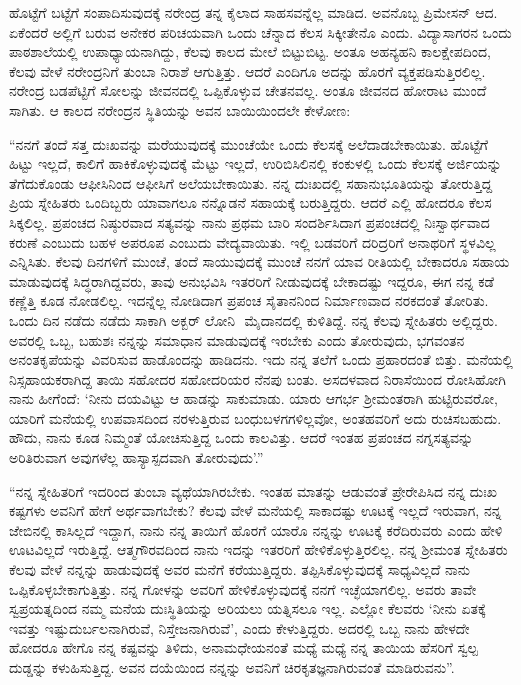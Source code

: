 ಹೊಟ್ಟೆಗೆ ಬಟ್ಟೆಗೆ ಸಂಪಾದಿಸುವುದಕ್ಕೆ ನರೇಂದ್ರ ತನ್ನ ಕೈಲಾದ ಸಾಹಸವನ್ನೆಲ್ಲ ಮಾಡಿದ. ಅವನೊಬ್ಬ ಪ್ರಿಮೇಸನ್ ಆದ. ಏಕೆಂದರೆ ಅಲ್ಲಿಗೆ ಬರುವ ಅನೇಕರ ಪರಿಚಯವಾಗಿ ಒಂದು ಚೆನ್ನಾದ ಕೆಲಸ ಸಿಕ್ಕೀತೇನೊ ಎಂದು. ವಿದ್ಯಾಸಾಗರನ ಒಂದು ಪಾಠಶಾಲೆಯಲ್ಲಿ ಉಪಾಧ್ಯಾಯನಾಗಿದ್ದು, ಕೆಲವು ಕಾಲದ ಮೇಲೆ ಬಿಟ್ಟುಬಿಟ್ಟ. ಅಂತೂ ಅಹನ್ಯಹನಿ ಕಾಲಕ್ಷೇಪದಿಂದ, ಕೆಲವು ವೇಳೆ ನರೇಂದ್ರನಿಗೆ ತುಂಬಾ ನಿರಾಶೆ ಆಗುತ್ತಿತ್ತು. ಆದರೆ ಎಂದಿಗೂ ಅದನ್ನು ಹೊರಗೆ ವ್ಯಕ್ತಪಡಿಸುತ್ತಿರಲಿಲ್ಲ. ನರೇಂದ್ರ ಬಡಪೆಟ್ಟಿಗೆ ಸೋಲನ್ನು ಜೀವನದಲ್ಲಿ ಒಪ್ಪಿಕೊಳ್ಳುವ ಚೇತನವಲ್ಲ. ಅಂತೂ ಜೀವನದ ಹೋರಾಟ ಮುಂದೆ ಸಾಗಿತು. ಆ ಕಾಲದ ನರೇಂದ್ರನ ಸ್ಥಿತಿಯನ್ನು ಅವನ ಬಾಯಿಯಿಂದಲೇ ಕೇಳೋಣ:

“ನನಗೆ ತಂದೆ ಸತ್ತ ದುಃಖವನ್ನು ಮರೆಯುವುದಕ್ಕೆ ಮುಂಚೆಯೇ ಒಂದು ಕೆಲಸಕ್ಕೆ ಅಲೆದಾಡಬೇಕಾಯಿತು. ಹೊಟ್ಟೆಗೆ ಹಿಟ್ಟು ಇಲ್ಲದೆ, ಕಾಲಿಗೆ ಹಾಕಿಕೊಳ್ಳುವುದಕ್ಕೆ ಮೆಟ್ಟು ಇಲ್ಲದೆ, ಉರಿಬಿಸಿಲಿನಲ್ಲಿ ಕಂಕುಳಲ್ಲಿ ಒಂದು ಕೆಲಸಕ್ಕೆ ಅರ್ಜಿಯನ್ನು ತೆಗೆದುಕೊಂಡು ಆಫೀಸಿನಿಂದ ಆಫೀಸಿಗೆ ಅಲೆಯಬೇಕಾಯಿತು. ನನ್ನ ದುಃಖದಲ್ಲಿ ಸಹಾನುಭೂತಿಯನ್ನು ತೋರುತ್ತಿದ್ದ ಪ್ರಿಯ ಸ್ನೇಹಿತರು ಒಂದಿಬ್ಬರು ಯಾವಾಗಲೂ ನನ್ನೊಡನೆ ಸಹಾಯಕ್ಕೆ ಬರುತ್ತಿದ್ದರು. ಆದರೆ ಎಲ್ಲಿ ಹೋದರೂ ಕೆಲಸ ಸಿಕ್ಕಲಿಲ್ಲ. ಪ್ರಪಂಚದ ನಿಷ್ಠುರವಾದ ಸತ್ಯವನ್ನು ನಾನು ಪ್ರಥಮ ಬಾರಿ ಸಂದರ್ಶಿಸಿದಾಗ ಪ್ರಪಂಚದಲ್ಲಿ ನಿಃಸ್ವಾರ್ಥವಾದ ಕರುಣೆ ಎಂಬುದು ಬಹಳ ಅಪರೂಪ ಎಂಬುದು ವೇದ್ಯವಾಯಿತು. ಇಲ್ಲಿ ಬಡವರಿಗೆ ದರಿದ್ರರಿಗೆ ಅನಾಥರಿಗೆ ಸ್ಥಳವಿಲ್ಲ ಎನ್ನಿಸಿತು. ಕೆಲವು ದಿನಗಳಿಗೆ ಮುಂಚೆ, ತಂದೆ ಸಾಯುವುದಕ್ಕೆ ಮುಂಚೆ ನನಗೆ ಯಾವ ರೀತಿಯಲ್ಲಿ ಬೇಕಾದರೂ ಸಹಾಯ ಮಾಡುವುದಕ್ಕೆ ಸಿದ್ಧರಾಗಿದ್ದವರು, ತಾವು ಅನುಭವಿಸಿ ಇತರರಿಗೆ ನೀಡುವುದಕ್ಕೆ ಬೇಕಾದಷ್ಟು ಇದ್ದರೂ, ಈಗ ನನ್ನ ಕಡೆ ಕಣ್ಣೆತ್ತಿ ಕೂಡ ನೋಡಲಿಲ್ಲ. ಇದನ್ನೆಲ್ಲ ನೋಡಿದಾಗ ಪ್ರಪಂಚ ಸೈತಾನನಿಂದ ನಿರ್ಮಾಣವಾದ ನರಕದಂತೆ ತೋರಿತು. ಒಂದು ದಿನ ನಡೆದು ನಡೆದು ಸಾಕಾಗಿ ಅಕ್ಬರ್ ಲೋನಿ ‍ ಮೈದಾನದಲ್ಲಿ ಕುಳಿತಿದ್ದೆ. ನನ್ನ ಕೆಲವು ಸ್ನೇಹಿತರು ಅಲ್ಲಿದ್ದರು. ಅವರಲ್ಲಿ ಒಬ್ಬ, ಬಹುಶಃ ನನ್ನನ್ನು ಸಮಾಧಾನ ಮಾಡುವುದಕ್ಕೆ ಇರಬೇಕು ಎಂದು ತೋರುವುದು, ಭಗವಂತನ ಅನಂತಕೃಪೆಯನ್ನು ವಿವರಿಸುವ ಹಾಡೊಂದನ್ನು ಹಾಡಿದನು. ಇದು ನನ್ನ ತಲೆಗೆ ಒಂದು ಪ್ರಹಾರದಂತೆ ಬಿತ್ತು. ಮನೆಯಲ್ಲಿ ನಿಸ್ಸಹಾಯಕರಾಗಿದ್ದ ತಾಯಿ ಸಹೋದರ ಸಹೋದರಿಯರ ನೆನಪು ಬಂತು. ಅಸದಳವಾದ ನಿರಾಸೆಯಿಂದ ರೋಸಿಹೋಗಿ ನಾನು ಹೀಗೆಂದೆ: ‘ನೀನು ದಯವಿಟ್ಟು ಆ ಹಾಡನ್ನು ಸಾಕುಮಾಡು. ಯಾರು ಆಗರ್ಭ ಶ‍್ರೀಮಂತರಾಗಿ ಹುಟ್ಟಿರುವರೋ, ಯಾರಿಗೆ ಮನೆಯಲ್ಲಿ ಉಪವಾಸದಿಂದ ನರಳುತ್ತಿರುವ ಬಂಧುಬಳಗಗಳಿಲ್ಲವೋ, ಅಂತಹವರಿಗೆ ಅದು ರುಚಿಸಬಹುದು. ಹೌದು, ನಾನು ಕೂಡ ನಿಮ್ಮಂತೆ ಯೋಚಿಸುತ್ತಿದ್ದ ಒಂದು ಕಾಲವಿತ್ತು. ಆದರೆ ಇಂತಹ ಪ್ರಪಂಚದ ನಗ್ನಸತ್ಯವನ್ನು ಅರಿತಿರುವಾಗ ಅವುಗಳೆಲ್ಲ ಹಾಸ್ಯಾಸ್ಪದವಾಗಿ ತೋರುವುದು’.”

“ನನ್ನ ಸ್ನೇಹಿತರಿಗೆ ಇದರಿಂದ ತುಂಬಾ ವ್ಯಥೆಯಾಗಿರಬೇಕು. ಇಂತಹ ಮಾತನ್ನು ಆಡುವಂತೆ ಪ್ರೇರೇಪಿಸಿದ ನನ್ನ ದುಃಖ ಕಷ್ಟಗಳು ಅವನಿಗೆ ಹೇಗೆ ಅರ್ಥವಾಗಬೇಕು? ಕೆಲವು ವೇಳೆ ಮನೆಯಲ್ಲಿ ಸಾಕಾದಷ್ಟು ಊಟಕ್ಕೆ ಇಲ್ಲದೆ ಇರುವಾಗ, ನನ್ನ ಜೇಬಿನಲ್ಲಿ ಕಾಸಿಲ್ಲದೆ ಇದ್ದಾಗ, ನಾನು ನನ್ನ ತಾಯಿಗೆ ಹೊರಗೆ ಯಾರೊ ನನ್ನನ್ನು ಊಟಕ್ಕೆ ಕರೆದಿರುವರು ಎಂದು ಹೇಳಿ ಊಟವಿಲ್ಲದೆ ಇರುತ್ತಿದ್ದೆ. ಆತ್ಮಗೌರವದಿಂದ ನಾನು ಇದನ್ನು ಇತರರಿಗೆ ಹೇಳಿಕೊಳ್ಳುತ್ತಿರಲಿಲ್ಲ. ನನ್ನ ಶ‍್ರೀಮಂತ ಸ್ನೇಹಿತರು ಕೆಲವು ವೇಳೆ ನನ್ನನ್ನು ಹಾಡುವುದಕ್ಕೆ ಅವರ ಮನೆಗೆ ಕರೆಯುತ್ತಿದ್ದರು. ತಪ್ಪಿಸಿಕೊಳ್ಳುವುದಕ್ಕೆ ಸಾಧ್ಯವಿಲ್ಲದೆ ನಾನು ಒಪ್ಪಿಕೊಳ್ಳಬೇಕಾಗುತ್ತಿತ್ತು. ನನ್ನ ಗೋಳನ್ನು ಅವರಿಗೆ ಹೇಳಿಕೊಳ್ಳುವುದಕ್ಕೆ ನನಗೆ ಇಚ್ಛೆಯಾಗಲಿಲ್ಲ. ಅವರು ತಾವೇ ಸ್ವಪ್ರಯತ್ನದಿಂದ ನಮ್ಮ ಮನೆಯ ದುಃಸ್ಥಿತಿಯನ್ನು ಅರಿಯಲು ಯತ್ನಿಸಲೂ ಇಲ್ಲ. ಎಲ್ಲೋ ಕೆಲವರು ‘ನೀನು ಏತಕ್ಕೆ ಇವತ್ತು ಇಷ್ಟು\break ದುರ್ಬಲನಾಗಿರುವೆ, ನಿಸ್ತೇಜನಾಗಿರುವೆ’, ಎಂದು ಕೇಳುತ್ತಿದ್ದರು. ಅದರಲ್ಲಿ ಒಬ್ಬ ನಾನು ಹೇಳದೇ ಹೋದರೂ ಹೇಗೊ ನನ್ನ ಕಷ್ಟವನ್ನು ತಿಳಿದು, ಅನಾಮಧೇಯನಂತೆ ಮಧ್ಯೆ ಮಧ್ಯೆ ನನ್ನ ತಾಯಿಯ ಹೆಸರಿಗೆ ಸ್ವಲ್ಪ ದುಡ್ಡನ್ನು ಕಳುಹಿಸುತ್ತಿದ್ದ. ಅವನ ದಯೆಯಿಂದ ನನ್ನನ್ನು ಅವನಿಗೆ ಚಿರಕೃತಜ್ಞನಾಗಿರುವಂತೆ ಮಾಡಿರುವನು”.


